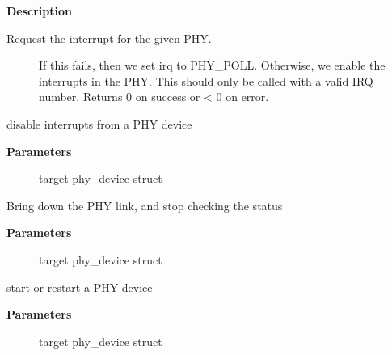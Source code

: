 \documentclass[a4paper,8pt,english]{sphinxmanual}
\begin{document}
\textbf{Description}
\begin{description}
\item[{Request the interrupt for the given PHY.}] \leavevmode
If this fails, then we set irq to PHY\_POLL.
Otherwise, we enable the interrupts in the PHY.
This should only be called with a valid IRQ number.
Returns 0 on success or \textless{} 0 on error.

\end{description}

\begin{fulllineitems}
\label{networking/kapi:c.phy_stop_interrupts}
disable interrupts from a PHY device

\end{fulllineitems}


\textbf{Parameters}
\begin{description}
\item[{}] \leavevmode
target phy\_device struct

\end{description}

\begin{fulllineitems}
\label{networking/kapi:c.phy_stop}
Bring down the PHY link, and stop checking the status

\end{fulllineitems}


\textbf{Parameters}
\begin{description}
\item[{}] \leavevmode
target phy\_device struct

\end{description}

\begin{fulllineitems}
\label{networking/kapi:c.phy_start}
start or restart a PHY device

\end{fulllineitems}


\textbf{Parameters}
\begin{description}
\item[{}] \leavevmode
target phy\_device struct

\end{description}
\end{document}
